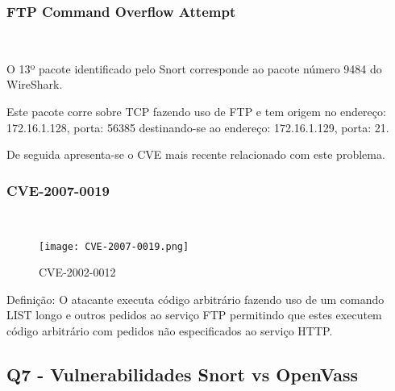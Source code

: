 \subsubsection{FTP Command Overflow Attempt}
\hfill\\
\par O 13º pacote identificado pelo Snort corresponde ao pacote número 9484 do WireShark.
\par Este pacote corre sobre TCP fazendo uso de FTP e tem origem no endereço: 172.16.1.128, porta: 56385 destinando-se ao endereço: 172.16.1.129, porta: 21.
\par De seguida apresenta-se o CVE mais recente relacionado com este problema.

\subsubsection{CVE-2007-0019}
\hfill\\
\begin{figure}[H]

  \centering

  \texttt{[image: CVE-2007-0019.png]}

  \caption {CVE-2002-0012}

  \label {fig2}

\end{figure}

\par Definição: O atacante executa código arbitrário fazendo uso de um comando LIST longo e outros pedidos ao serviço FTP permitindo que estes executem código arbitrário com pedidos não especificados ao serviço HTTP.



\subsection{Q7 - Vulnerabilidades Snort vs OpenVass}

